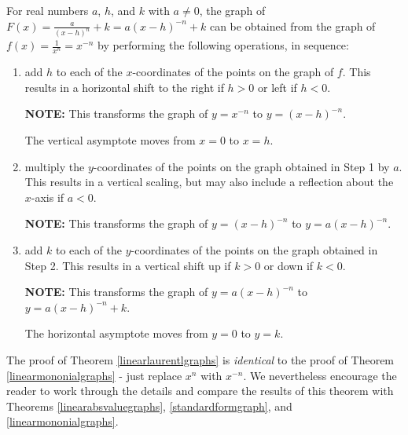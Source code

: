 \begin{ithm} \label{linearlaurentlgraphs}  For real numbers $a$, $h$, and $k$ with $a \neq 0$, the graph of $F(x) = \frac{a}{(x-h)^n}+k =  a(x-h)^{-n}+k$  can be obtained from the graph of $f(x) = \frac{1}{x^n}= x^{-n}$ by performing the following operations, in sequence:

\begin{enumerate}

\item  add $h$ to each of the $x$-coordinates of the points on the graph of $f$.  This results in a horizontal shift to the right if $h > 0$ or left if $h < 0$.

\textbf{NOTE:}  This transforms the graph of $y = x^{-n}$ to $y = (x-h)^{-n}$.   

The vertical asymptote moves from $x=0$ to $x=h$.

\item  multiply the $y$-coordinates of the points on the graph obtained in Step 1 by $a$.   This results in a vertical scaling, but may also include a reflection about the $x$-axis if $a < 0$.

\textbf{NOTE:}  This transforms the graph of $y = (x-h)^{-n}$ to $y = a(x-h)^{-n}$.

\item  add $k$ to each of the $y$-coordinates of the points on the graph obtained in Step 2.  This results in a vertical shift up if $k > 0$ or down if $k< 0$.

\textbf{NOTE:}  This transforms the graph of  $y = a(x-h)^{-n}$ to $y = a(x-h)^{-n}+k$.

The  horizontal asymptote moves from $y=0$ to $y=k$.

\end{enumerate}

\end{ithm}

The proof of Theorem \ref{linearlaurentlgraphs} is \textit{identical} to the proof of Theorem \ref{linearmononialgraphs} - just replace $x^n$ with $x^{-n}$.  We nevertheless encourage the reader to work through the details  and compare the results of this theorem with Theorems \ref{linearabsvaluegraphs}, \ref{standardformgraph}, and  \ref{linearmononialgraphs}.

